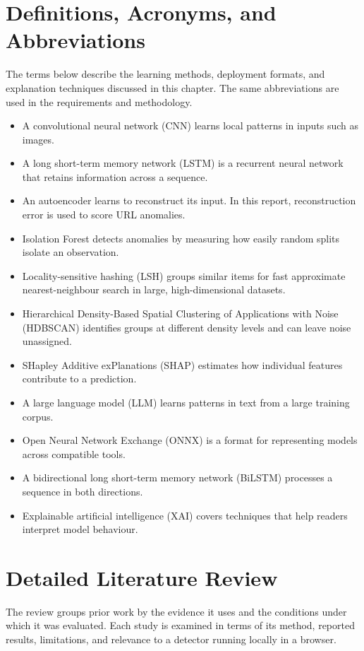 \documentclass{FastFyp}
\begin{document}
\section{Definitions, Acronyms, and Abbreviations}
\label{sec:litreview-definitions}
The terms below describe the learning methods, deployment formats, and explanation techniques discussed in this chapter. The same abbreviations are used in the requirements and methodology.

\begin{itemize}
    \item A convolutional neural network (CNN) learns local patterns in inputs such as images.
    \item A long short-term memory network (LSTM) is a recurrent neural network that retains information across a sequence.
    \item An autoencoder learns to reconstruct its input. In this report, reconstruction error is used to score URL anomalies.
    \item Isolation Forest detects anomalies by measuring how easily random splits isolate an observation.
    \item Locality-sensitive hashing (LSH) groups similar items for fast approximate nearest-neighbour search in large, high-dimensional datasets.
    \item Hierarchical Density-Based Spatial Clustering of Applications with Noise (HDBSCAN) identifies groups at different density levels and can leave noise unassigned.
    \item SHapley Additive exPlanations (SHAP) estimates how individual features contribute to a prediction.
    \item A large language model (LLM) learns patterns in text from a large training corpus.
    \item Open Neural Network Exchange (ONNX) is a format for representing models across compatible tools.
    \item A bidirectional long short-term memory network (BiLSTM) processes a sequence in both directions.
    \item Explainable artificial intelligence (XAI) covers techniques that help readers interpret model behaviour.
\end{itemize}

\section{Detailed Literature Review}
\label{sec:litreview}
The review groups prior work by the evidence it uses and the conditions under which it was evaluated. Each study is examined in terms of its method, reported results, limitations, and relevance to a detector running locally in a browser.
\end{document}
